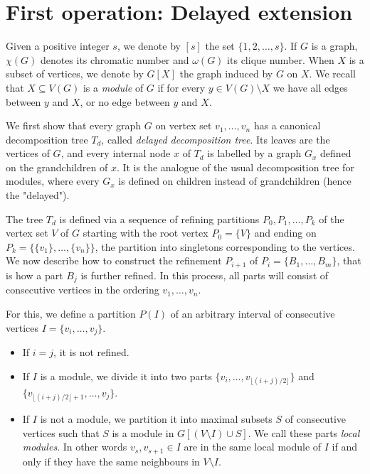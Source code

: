 \section{First operation: Delayed extension}

Given a positive integer $s$, we denote by $[s]$ the set $\{1, 2, \ldots, s\}$. If $G$ is a graph, $\chi(G)$ denotes its chromatic number and $\omega(G)$ its clique number. When $X$ is a subset of vertices, we denote by $G[X]$ the graph induced by $G$ on $X$. We recall that $X\subseteq V(G)$ is a \emph{module} of $G$ if for every $y\in V(G)\setminus X$ we have all edges between $y$ and $X$, or no edge between $y$ and $X$.

We first show that every graph $G$ on vertex set $v_1, \ldots, v_n$ has a canonical decomposition tree $T_d$, called \emph{delayed decomposition tree}. Its leaves are the vertices of $G$, and every internal node $x$ of $T_d$ is labelled by a graph $G_x$ defined on the grandchildren of $x$. It is the analogue of the usual decomposition tree for modules, where every $G_x$ is defined on children instead of grandchildren (hence the "delayed"). 

The tree $T_d$ is defined via a sequence of refining partitions $P_0,P_1,\dots ,P_k$ of the vertex set $V$ of $G$ starting with the root vertex $P_0=\{V\}$ and ending on $P_k=\{\{v_1\}, \ldots, \{v_n\}\}$, the partition into singletons corresponding to the vertices. We now describe how to construct the refinement $P_{i+1}$ of $P_i=\{B_1, \ldots, B_m\}$, that is how a part $B_j$ is further refined. In this process, all parts will consist of consecutive vertices in the ordering $v_1, \ldots, v_n$.

For this, we define a partition $P(I)$ of an arbitrary interval of consecutive vertices $I=\{v_i,\dots, v_j\}$.

\begin{itemize}
    \item If $i=j$, it is not refined.
    \item If $I$ is a module, we divide it into two parts $\{v_i,\dots ,v_{\lfloor (i+j)/2\rfloor}\}$ and $\{v_{\lfloor (i+j)/2\rfloor+1},\dots, v_j\}$.
    \item If $I$ is not a module, we partition it into maximal subsets $S$ of consecutive vertices such that $S$ is a module in $G[(V\setminus I)\cup S]$. We call these parts \emph{local modules}.
   In other words $v_s,v_{s+1}\in I$ are in the same local module of $I$ if and only if they have the same neighbours in $V\setminus I$.
\end{itemize}

